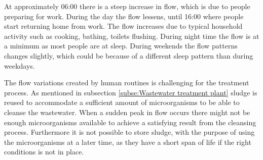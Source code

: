At approximately 06:00 there is a steep increase in flow, which is due to people preparing for work. During the day the flow lessens, until 16:00 where people start returning home from work. The flow increases due to typical household activity such as cooking, bathing, toilets flushing. During night time the flow is at a minimum as most people are at sleep. During weekends the flow patterns changes slightly, which could be because of a different sleep pattern than during weekdays.  %

The flow variations created by human routines is challenging for the treatment process. As mentioned in subsection \ref{subse:Wastewater treatment plant} sludge is reused to accommodate a sufficient amount of microorganisms to be able to cleanse the wastewater. When a sudden peak in flow occurs there might not be enough microorganisms available to achieve a satisfying result from the cleansing process. Furthermore it is not possible to store sludge, with the purpose of using the microorganisms at a later time, as they have a short span of life if the right conditions is not in place.

